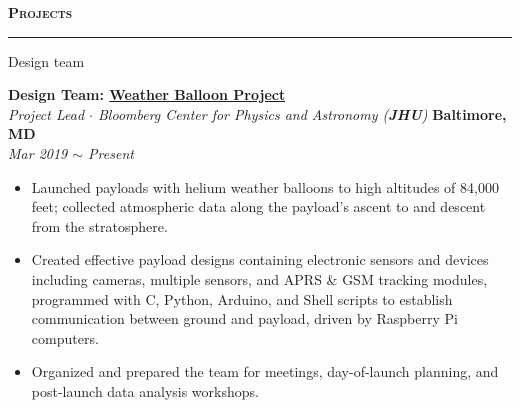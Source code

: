 \documentclass[10pt, letterpaper]{article}
\begin{document}
{\large \textbf{\textsc{Projects}}}
\vspace{5pt}
\hrule
Design team
\begin{paracol}{2}
	\textbf{Design Team: \href{https://nearspace.jhu.edu/}{Weather Balloon Project}}\\
	\textit{Project Lead $\cdot$ Bloomberg Center for Physics and Astronomy (\textbf{JHU})}
	\switchcolumn
	\raggedleft\textbf{Baltimore, MD}\\
	\raggedleft\textit{Mar 2019 $\sim$ Present}
\end{paracol}\vspace{-1mm}
\vspace{-2mm}
\begin{itemize}
	\item  Launched payloads with helium weather balloons to high altitudes of 84,000
	feet; collected atmospheric data along the payload's ascent to and descent from the 
	stratosphere.\vspace{-3mm}
	\item Created effective payload designs containing electronic sensors and devices including
	cameras, multiple sensors, and APRS \& GSM tracking modules, programmed with C, Python, 
	Arduino, and Shell scripts to establish communication between ground and payload,
	driven by Raspberry Pi computers.\vspace{-3mm}
	\item Organized and prepared the team for meetings, day-of-launch planning,
	and post-launch data analysis workshops.
\end{itemize}
\vspace{-2mm}
\fi
\end{document}
